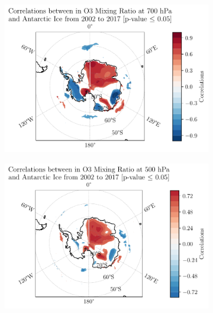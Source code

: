 \documentclass[../main.tex]{subfiles}
\begin{document}
\begin{figure}[hbt!]
    \centering
    \begin{subfigure}[b]{0.45\textwidth}
    \includegraphics[width=\textwidth]{images/2021w5/chapter7/hres/correlation_spatial_o3_700}
    \end{subfigure}
    \begin{subfigure}[b]{0.45\textwidth}
    \includegraphics[width=\textwidth]{images/2021w5/chapter7/hres/correlation_spatial_o3_500}
    \end{subfigure}
    \begin{subfigure}[b]{0.45\textwidth}

\end{subfigure}
\end{figure}
\end{document}
